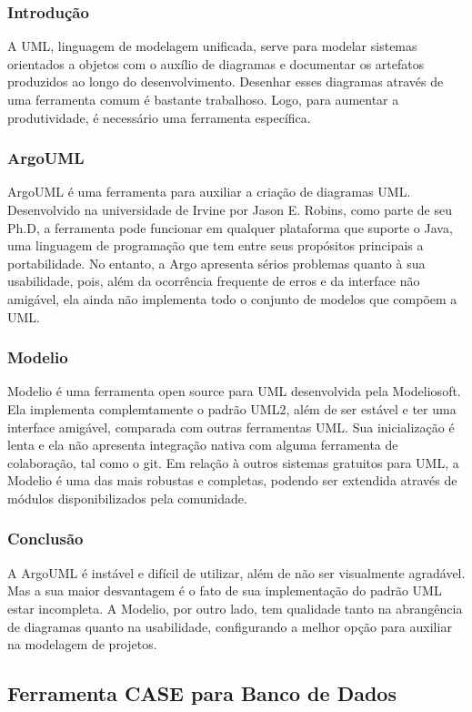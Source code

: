 \documentclass[12pt,a4paper]{article}
\begin{document}
		\subsubsection{Introdução}
			A UML, linguagem de modelagem unificada, serve para modelar sistemas orientados
			a objetos com o auxílio de diagramas e documentar os artefatos
			produzidos ao longo do desenvolvimento. Desenhar esses diagramas através de uma ferramenta
			comum é bastante trabalhoso. Logo, para aumentar a produtividade, é necessário
			uma ferramenta específica.
		\subsubsection{ArgoUML}
			ArgoUML é uma ferramenta para auxiliar a criação de diagramas UML. Desenvolvido
			na universidade de Irvine por Jason E. Robins, como parte de seu Ph.D, a ferramenta
			pode funcionar em qualquer plataforma que suporte o Java, uma linguagem de 
			programação que tem entre seus propósitos principais a portabilidade.
			No entanto, a Argo apresenta sérios problemas quanto à sua usabilidade, pois,
			além da ocorrência frequente de erros e da interface não amigável, ela ainda não
			implementa todo o conjunto de modelos que compõem a UML.
		\subsubsection{Modelio}
			Modelio é uma ferramenta open source para UML desenvolvida pela Modeliosoft.
			Ela implementa complemtamente o padrão UML2, além de ser estável e ter uma interface
			amigável, comparada com outras ferramentas UML. Sua inicialização é lenta e ela não
			apresenta integração nativa com alguma ferramenta de colaboração, tal como o git.
			Em relação à outros sistemas gratuitos para UML, a Modelio é uma das mais robustas
			e completas, podendo ser extendida através de módulos disponibilizados pela comunidade.
		\subsubsection{Conclusão}
			A ArgoUML é instável e difícil de utilizar, além de não ser visualmente agradável. Mas
			a sua maior desvantagem é o fato de sua implementação do padrão UML estar incompleta.
			A Modelio, por outro lado, tem qualidade tanto na abrangência de diagramas quanto
			na usabilidade, configurando a melhor opção para auxiliar na modelagem de projetos.

	\clearpage
	\subsection{Ferramenta CASE para Banco de Dados}
\end{document}
